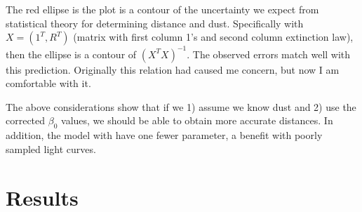 \documentclass[12pt]{article}
\begin{document}
The red ellipse is the plot is a contour of the uncertainty we expect from statistical theory for determining distance and dust. Specifically with $X = (1^T,R^T)$ (matrix with first column 1's and second column extinction law), then the ellipse is a contour of $(X^TX)^{-1}$. The observed errors match well with this prediction. Originally this relation had caused me concern, but now I am comfortable with it.

The above considerations show that if we 1) assume we know dust and 2) use the corrected $\beta_0$ values, we should be able to obtain more accurate distances. In addition, the model with have one fewer parameter, a benefit with poorly sampled light curves.


\section{Results}

%
%
\end{document}
